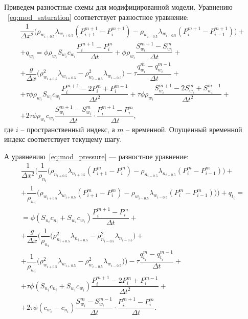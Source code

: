 Приведем разностные схемы для модифицированной модели.
Уравнению ~\eqref{eq:mod_saturation} соответствует разностное уравнение:
\begin{equation} \label{eq:mod_scheme_s}
 \begin{gathered} 
   \dfrac{1}{\Delta x^2} \bigg(\rho_{w_{i+0.5}} \lambda_{w_{i+0.5}} (P_{i+1}^{m+1} - P_i^{m+1})
  - \rho_{w_{i-0.5}} \lambda_{w_{i-0.5}} (P_i^{m+1} - P_{i-1}^{m+1}) \bigg) +\\
  + q_{w_i} = \phi\rho_{w_i}S_{w_i}c_{w_i} \dfrac{P_i^{m+1} - P_i^m}{\Delta t} + \phi\rho_{w_i} \dfrac{S_{w_i}^{m+1} - S_{w_i}^m}{\Delta t} +\\ 
  + \dfrac{g}{\Delta x} \bigg(\rho_{w_{i+0.5}}^2 \lambda_{w_{i+0.5}} - \rho_{w_{i-0.5}}^2 \lambda_{w_{i-0.5}} \bigg)
  - \tau \dfrac{q_{w_i}^m-q_{w_i}^{m-1}}{\Delta t} + \\
  + \tau \phi \rho_{w_i}S_{w_i}c_{w_i} \dfrac{P_i^{m+1}-2P_i^m+P_i^{m-1}}{\Delta t^2}
  + \tau \phi \rho_{w_i} \dfrac{S_{w_i}^{m+1}-2S_{w_i}^m+S_{w_i}^{m-1}}{\Delta t^2} +\\
  + 2 \tau \phi \rho_{w_i} c_{w_i} \dfrac{S_{w_i}^{m+1}-S_{w_i}^{m}}{\Delta t} \cdot \dfrac{P_i^{m+1}-P_i^m}{\Delta t},
 \end{gathered}
\end{equation}
где $i$ -- пространственный индекс, а $m$ -- временной. Опущенный временной индекс соответствует текущему шагу.

А уравнению~\eqref{eq:mod_pressure} --- разностное уравнение:
\begin{equation} \label{eq:mod_scheme_p}
 \begin{gathered} 
  \dfrac{1}{\Delta x^2} \bigg(\dfrac{1}{\rho_{n_i}} \big( \rho_{n_{i+0.5}} \lambda_{n_{i+0.5}} (P_{i+1}^m - P_i^m)
  - \rho_{n_{i-0.5}} \lambda_{n_{i-0.5}} (P_i^m - P_{i-1}^m)\big) + \\
  + \dfrac{1}{\rho_{w_i}} \big( \rho_{w_{i+0.5}} \lambda_{w_{i+0.5}} (P_{i+1}^m - P_i^m)
  - \rho_{w_{i-0.5}} \lambda_{w_{i-0.5}} (P_i^m - P_{i-1}^m)\big)\bigg) + q_{t_i} = \\
  = \phi(S_{n_i}c_{n_i}+S_{w_i}c_{w_i}) \dfrac{P_i^{m+1} - P_i^m}{\Delta t} +\\
  + \dfrac{g}{\Delta x} \bigg(\dfrac{1}{\rho_{n_i}} \big( \rho_{n_{i+0.5}}^2 \lambda_{n_{i+0.5}} 
  - \rho_{n_{i-0.5}}^2 \lambda_{n_{i-0.5}} \big) + \\
  + \dfrac{1}{\rho_{w_i}} \big( \rho_{w_{i+0.5}}^2 \lambda_{w_{i+0.5}} 
  - \rho_{w_{i-0.5}}^2 \lambda_{w_{i-0.5}} \big)\bigg)
  - \tau \dfrac{q_{t_i}^m-q_{t_i}^{m-1}}{\Delta t} + \\
  + \tau \phi (S_{n_i}c_{n_i}+S_{w_i}c_{w_i}) \dfrac{P_i^{m+1}-2P_i^m+P_i^{m-1}}{\Delta t^2} +\\
  + 2 \tau \phi (c_{w_i}-c_{n_i}) \dfrac{S_{w_i}^m-S_{w_i}^{m-1}}{\Delta t} \cdot \dfrac{P_i^{m+1}-P_i^m}{\Delta t}.
 \end{gathered}
\end{equation}

